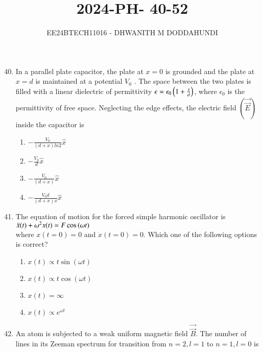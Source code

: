 \documentclass[journal]{IEEEtran}
\begin{document}

\vspace{3cm}

\title{2024-PH- 40-52}
\author{EE24BTECH11016 - DHWANITH M DODDAHUNDI}

{\let\newpage\relax\maketitle}

\renewcommand{\thefigure}{\theenumi}
\renewcommand{\thetable}{\theenumi}
\setlength{\intextsep}{10pt} %

\begin{enumerate}
\setcounter{enumi}{39}
\item In a parallel plate capacitor, the plate at $x=0$ is grounded and the plate at $x=d$ is
maintained at a potential $V_{0}$ . The space between the two plates is filled with a linear
dielectric of permittivity $\epsilon=\epsilon_{0}\left(1+\frac{x}{d}\right)$, where $\epsilon_{0}$ is the permittivity of free space.
Neglecting the edge effects, the electric field $(\Vec{\overrightarrow{E}})$ inside the capacitor is
\begin{enumerate}
    \item $-\frac{V_{0}}{(d+x)ln 2}\hat{x}$
    \item $-\frac{V_{0}}{d}\hat{x}$
    \item $-\frac{V_{0}}{(d+x)}\hat{x}$
    \item $-\frac{V_{0}d}{(d+x)x}\hat{x}$
\end{enumerate}
\item The equation of motion for the forced simple harmonic oscillator is \\
$\Ddot{x}(t)+\omega^{2}x(t)=F\cos{(\omega t)}$ \\
    where $x(t=0)=0$ and $\Dot{x}(t=0)=0$. Which one of the following options is
correct?
    \begin{enumerate}
        \item $x(t)\propto t\sin{(\omega t)}$
        \item $x(t)\propto t\cos{(\omega t)}$
        \item $x(t)=\infty$
        \item $x(t)\propto e^{\omega t}$
    \end{enumerate}
    \item An atom is subjected to a weak uniform magnetic field $\Vec{\overrightarrow{B}}$. The number of lines in its Zeeman spectrum for transition from $n=2,l=1$ to $n=1,l=0$ is

\end{enumerate}
\end{document}

